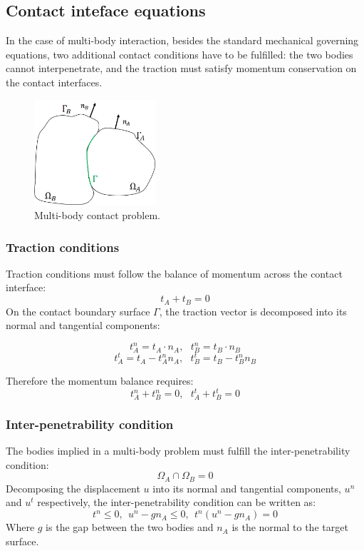 \subsection{Contact inteface equations}%
 In the case of multi-body interaction, besides the standard mechanical governing equations, two additional contact conditions have to be fulfilled: the two bodies cannot interpenetrate, and the traction must satisfy momentum conservation on the contact interfaces.
   

\begin{figure}[h]
\centering
\centerline{\includegraphics[width=0.4\textwidth,keepaspectratio]{figures/contact_bodies.jpg} }
\caption{Multi-body contact problem.}
\label{contact_bodies}
\end{figure}

   
  \subsubsection*{Traction conditions}
  Traction conditions must follow the balance of momentum across the contact interface:
  \begin{equation}
  t_A + t_B=0
\end{equation}
On the contact boundary surface $\Gamma$, the traction vector is decomposed into its normal and tangential components:

$$t_A^n = t_A \cdot n_A,  \ \ \ t_B^n = t_B \cdot n_B$$
$$t_A^t = t_A - t_A^n n_A, \ \ \ t_B^t = t_B - t_B^n n_B$$

Therefore the momentum balance requires:
\begin{equation} 
t_A^n + t_B^n = 0, \ \ \ t_A^t + t_B^t = 0
\end{equation} 

 \subsubsection*{Inter-penetrability condition}
The bodies implied in a multi-body problem must fulfill the inter-penetrability condition:
\begin{equation}
\Omega_A \cap \Omega_B = 0
\end{equation}
Decomposing the displacement $u$ into its normal and tangential components, $u^n$ and $u^t$ respectively, the inter-penetrability condition can be written as:
\begin{equation}
t^n \leq 0, \ \ u^n-g n_A \leq 0, \ \ t^n(u^n-g n_A) = 0
\end{equation}
 Where $g$ is the gap between the two bodies and $n_A$ is the normal to the target surface.

